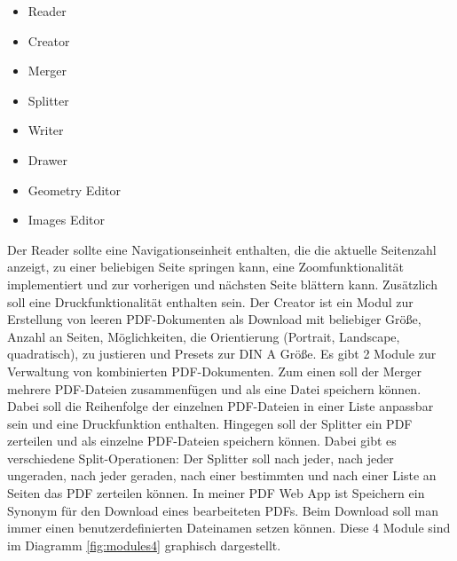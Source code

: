 \begin{itemize}
	\item Reader
	\item Creator
	\item Merger
	\item Splitter
	\item Writer
	\item Drawer
	\item Geometry Editor
	\item Images Editor
\end{itemize}

Der Reader sollte eine Navigationseinheit enthalten, die die aktuelle Seitenzahl anzeigt, zu einer beliebigen Seite springen kann, eine Zoomfunktionalität implementiert und zur vorherigen und nächsten Seite blättern kann. Zusätzlich soll eine Druckfunktionalität enthalten sein. Der Creator ist ein Modul zur Erstellung von leeren PDF-Dokumenten als Download mit beliebiger Größe, Anzahl an Seiten, Möglichkeiten, die Orientierung (Portrait, Landscape, quadratisch), zu justieren und Presets zur DIN A Größe. Es gibt 2 Module zur Verwaltung von kombinierten PDF-Dokumenten. Zum einen soll der Merger mehrere PDF-Dateien zusammenfügen und als eine Datei speichern können. Dabei soll die Reihenfolge der einzelnen PDF-Dateien in einer Liste anpassbar sein und eine Druckfunktion enthalten. Hingegen soll der Splitter ein PDF zerteilen und als einzelne PDF-Dateien speichern können. Dabei gibt es verschiedene Split-Operationen: Der Splitter soll nach jeder, nach jeder ungeraden, nach jeder geraden, nach einer bestimmten und nach einer Liste an Seiten das PDF zerteilen können. In meiner PDF Web App ist Speichern ein Synonym für den Download eines bearbeiteten PDFs. Beim Download soll man immer einen benutzerdefinierten Dateinamen setzen können. Diese 4 Module sind im Diagramm \ref{fig:modules4} graphisch dargestellt. 

